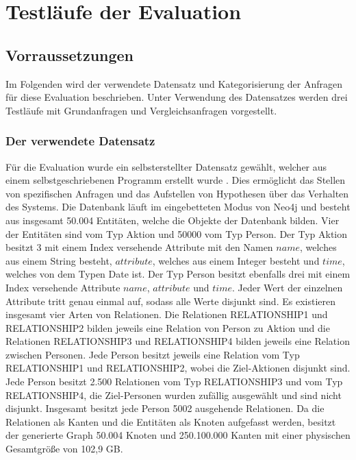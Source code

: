 
\chapter{Testläufe der Evaluation} %

\label{Kapitel3} %

\section{Vorraussetzungen}
Im Folgenden wird der verwendete Datensatz und Kategorisierung der Anfragen für diese Evaluation beschrieben. Unter Verwendung des Datensatzes werden drei Testläufe mit Grundanfragen und Vergleichsanfragen vorgestellt.  
\subsection{Der verwendete Datensatz}
Für die Evaluation wurde ein selbsterstellter Datensatz gewählt, welcher aus einem selbstgeschriebenen Programm erstellt wurde \parencite{Code}. Dies ermöglicht das Stellen von  spezifischen Anfragen und das Aufstellen von Hypothesen über das Verhalten des Systems. Die Datenbank läuft im eingebetteten Modus von Neo4j und besteht aus insgesamt 50.004 Entitäten, welche die Objekte der Datenbank bilden. Vier der Entitäten sind  vom Typ Aktion und 50000 vom Typ Person. Der Typ Aktion besitzt 3 mit einem Index versehende Attribute mit den Namen $name$, welches aus einem String besteht, $attribute$, welches aus einem Integer besteht und $time$, welches von dem Typen Date ist. Der Typ Person besitzt ebenfalls drei mit einem Index versehende Attribute $name$, $attribute$ und $time$. Jeder Wert der einzelnen Attribute tritt genau einmal auf, sodass alle Werte disjunkt sind. \newline
Es existieren insgesamt vier Arten von Relationen. Die Relationen RELATIONSHIP1 und RELATIONSHIP2 bilden jeweils eine Relation von Person zu Aktion und die Relationen RELATIONSHIP3 und RELATIONSHIP4 bilden jeweils eine Relation zwischen Personen. Jede Person besitzt jeweils eine Relation vom Typ RELATIONSHIP1 und RELATIONSHIP2, wobei die Ziel-Aktionen disjunkt sind. Jede Person besitzt 2.500 Relationen vom Typ RELATIONSHIP3 und vom Typ RELATIONSHIP4, die Ziel-Personen wurden zufällig ausgewählt und sind nicht disjunkt. Insgesamt besitzt jede Person 5002 ausgehende Relationen. Da die Relationen als Kanten und die Entitäten als Knoten aufgefasst werden, besitzt der generierte Graph 50.004 Knoten und 250.100.000 Kanten mit einer physischen Gesamtgröße von 102,9 GB. 
